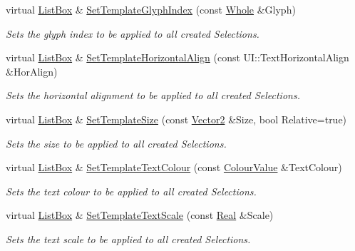 \begin{DoxyCompactItemize}
virtual \hyperlink{classphys_1_1UI_1_1ListBox}{ListBox} \& \hyperlink{classphys_1_1UI_1_1ListBox_a4bce62d1cee20950c41897e439fb3d79}{SetTemplateGlyphIndex} (const \hyperlink{namespacephys_a460f6bc24c8dd347b05e0366ae34f34a}{Whole} \&Glyph)
\begin{DoxyCompactList}\small\item\em Sets the glyph index to be applied to all created Selections. \item\end{DoxyCompactList}\item 
virtual \hyperlink{classphys_1_1UI_1_1ListBox}{ListBox} \& \hyperlink{classphys_1_1UI_1_1ListBox_a00ccdbe0b3a8da306b7346dff04792e0}{SetTemplateHorizontalAlign} (const UI::TextHorizontalAlign \&HorAlign)
\begin{DoxyCompactList}\small\item\em Sets the horizontal alignment to be applied to all created Selections. \item\end{DoxyCompactList}\item 
virtual \hyperlink{classphys_1_1UI_1_1ListBox}{ListBox} \& \hyperlink{classphys_1_1UI_1_1ListBox_abe6281a6f885be920ba540b81df3cf59}{SetTemplateSize} (const \hyperlink{classphys_1_1Vector2}{Vector2} \&Size, bool Relative=true)
\begin{DoxyCompactList}\small\item\em Sets the size to be applied to all created Selections. \item\end{DoxyCompactList}\item 
virtual \hyperlink{classphys_1_1UI_1_1ListBox}{ListBox} \& \hyperlink{classphys_1_1UI_1_1ListBox_a0106fde625c9e950f27a3e2611444359}{SetTemplateTextColour} (const \hyperlink{classphys_1_1ColourValue}{ColourValue} \&TextColour)
\begin{DoxyCompactList}\small\item\em Sets the text colour to be applied to all created Selections. \item\end{DoxyCompactList}\item 
virtual \hyperlink{classphys_1_1UI_1_1ListBox}{ListBox} \& \hyperlink{classphys_1_1UI_1_1ListBox_a160bc4d74c99f544a4339a3ba050868a}{SetTemplateTextScale} (const \hyperlink{namespacephys_af7eb897198d265b8e868f45240230d5f}{Real} \&Scale)
\begin{DoxyCompactList}\small\item\em Sets the text scale to be applied to all created Selections. \item\end{DoxyCompactList}\item 

\end{DoxyCompactItemize}
